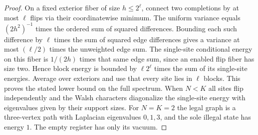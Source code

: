 \documentclass[11pt,reqno]{amsart}
\theoremstyle{definition}
\theoremstyle{remark}
\numberwithin{equation}{section}
\begin{document}
\begin{proof}
On a fixed exterior fiber of size \(h\le2^\ell\), connect two
completions by at most \(\ell\) flips via their coordinatewise
minimum. The uniform variance equals \((2h^2)^{-1}\) times
the ordered sum of squared differences. Bounding each such
difference by \(\ell\) times the sum of squared edge differences
gives a variance at most \((\ell/2)\) times the unweighted
edge sum. The single-site conditional energy on this fiber
is \(1/(2h)\) times that same edge sum, since an enabled
flip fiber has size two. Hence block energy is bounded by
\(\ell 2^\ell\) times the sum of its single-site energies.
Average over exteriors and use that every site lies in
\(\ell\) blocks. This proves the stated lower bound on the
full spectrum. When \(N<K\) all sites flip independently
and the Walsh characters diagonalize the single-site energy
with eigenvalues given by their support sizes. For \(N=K=2\)
the legal graph is a three-vertex path with Laplacian
eigenvalues \(0,1,3\), and the sole illegal state has energy
\(1\). The empty register has only its vacuum.
\end{proof}
\end{document}
